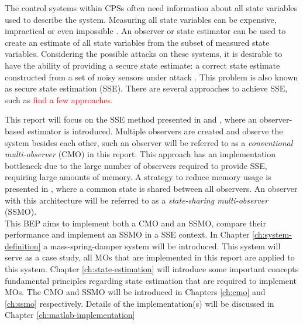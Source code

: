 The control systems within CPSs often need information about all state variables used to describe the system. Measuring all state variables can be expensive, impractical or even impossible \cite{yappa}. An observer or state estimator can be used to create an estimate of all state variables from the subset of measured state variables. Considering the possible attacks on these systems, it is desirable to have the ability of providing a secure state estimate: a correct state estimate constructed from a set of noisy sensors under attack \cite{ShoukrySecureApproach}. This problem is also known as secure state estimation (SSE). There are several approaches to achieve SSE, such as \textcolor{red}{find a few approaches.}

This report will focus on the SSE method presented in \cite{Chong2015ObservabilityAttacks} and \cite{Chong2020AAttacks}, where an observer-based estimator is introduced. Multiple observers are created and observe the system besides each other, such an observer will be referred to as a \textit{conventional multi-observer} (CMO) in this report. This approach has an implementation bottleneck due to the large number of observers required to provide SSE, requiring large amounts of memory. A strategy to reduce memory usage is presented in \cite{Chong2023MemoryAlgorithms}, where a common state is shared between all observers. An observer with this architecture will be referred to as a \textit{state-sharing multi-observer} (SSMO). \\

This BEP aims to implement both a CMO and an SSMO, compare their performance and implement an SSMO in a SSE context. In Chapter \ref{ch:system-definition} a mass-spring-damper system will be introduced. This system will serve as a case study, all MOs that are implemented in this report are applied to this system. Chapter \ref{ch:state-estimation} will introduce some important concepts fundamental principles regarding state estimation that are required to implement MOs. The CMO and SSMO will be introduced in Chapters \ref{ch:cmo} and \ref{ch:ssmo} respectively. Details of the implementation(s) will be discussed in Chapter \ref{ch:matlab-implementation}